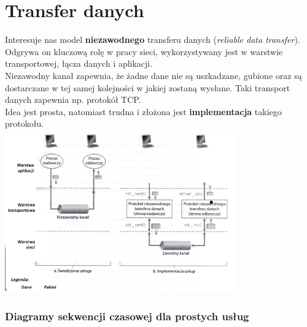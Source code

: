 \documentclass[a4paper,twoside]{article}
\begin{document}
\part{Transfer danych}
Interesuje nas model \textbf{niezawodnego} transferu danych (\emph{reliable data transfer}). Odgrywa on kluczową rolę w pracy sieci, wykorzystywany jest w warstwie transportowej, łącza danych i aplikacji.\\
Niezawodny kanał zapewnia, że żadne dane nie są uszkadzane, gubione oraz są dostarczane w tej samej kolejności w jakiej zostaną wysłane. Taki transport danych zapewnia np. protokół TCP.\\
Idea jest prosta, natomiast trudna i złożona jest \textbf{implementacja} takiego protokołu.\\
\includegraphics[width=10cm]{./images/image02.jpg}
\section{Diagramy sekwencji czasowej dla prostych usług}
\end{document}
